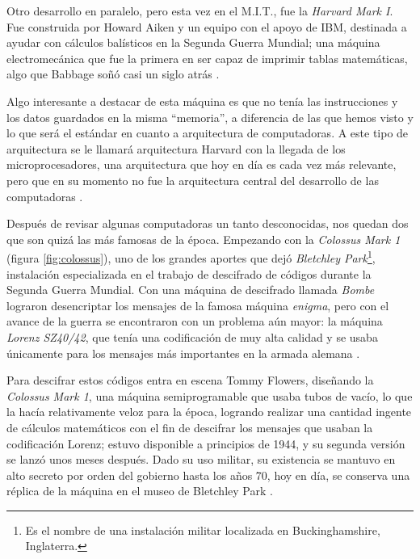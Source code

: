 \documentclass[letterpaper,12pt,oneside]{book}
\begin{document}
        Otro desarrollo en paralelo, pero
		esta vez en el M.I.T., fue la \textit{Harvard Mark I}. Fue construida por Howard Aiken y un equipo con el apoyo de IBM, destinada a ayudar con cálculos balísticos
		en la Segunda Guerra Mundial; una máquina electromecánica que fue la primera en ser capaz de imprimir tablas matemáticas, algo que Babbage soñó casi un
		siglo atrás \cite[pp. 212-218]{ifrah_universal_2001}.
  
        Algo interesante a destacar de esta máquina es que no tenía las instrucciones y los datos guardados en la misma 
		``memoria'', a diferencia de las que hemos
		visto y lo que será el estándar en cuanto a arquitectura de computadoras. A este tipo de arquitectura se le llamará
		arquitectura Harvard con la llegada de los microprocesadores, una arquitectura que hoy en día es cada vez más relevante, pero que en su momento
		no fue la arquitectura central del desarrollo de las computadoras \cite{pawson_myth_2022}.
		
		
		Después de revisar algunas computadoras un tanto desconocidas, nos quedan dos que son quizá las más famosas de la época. Empezando con la 
		\textit{Colossus Mark 1} (figura \ref{fig:colossus}), uno de los grandes aportes que dejó \textit{Bletchley Park}\footnote{Es el nombre de una instalación militar localizada en Buckinghamshire, 	Inglaterra.}, instalación especializada en el trabajo de descifrado de códigos durante la Segunda Guerra Mundial. Con una máquina de descifrado llamada \textit{Bombe}
		lograron desencriptar los mensajes de la famosa máquina \textit{enigma}, pero con el avance de la guerra se encontraron con un problema aún mayor: la máquina
		\textit{Lorenz SZ40/42}, que tenía una codificación de muy alta calidad y se usaba únicamente para los mensajes más importantes en la armada alemana \cite{oregan_brief_2012}.
  
        Para
		descifrar estos códigos entra en escena Tommy Flowers, diseñando la \textit{Colossus Mark 1}, una máquina semiprogramable que usaba tubos de vacío, lo que la hacía
		relativamente veloz para la época, logrando realizar
		una cantidad ingente de cálculos matemáticos con el fin de descifrar los mensajes que usaban la codificación Lorenz; estuvo disponible a principios de 1944, y
		su segunda versión se lanzó unos meses después. Dado su uso militar, su existencia se mantuvo
		en alto secreto por orden del gobierno hasta los años 70, hoy en día, se conserva una réplica de la máquina en el museo de Bletchley Park  
		\cite[p.39]{oregan_brief_2012}.
		
\end{document}
